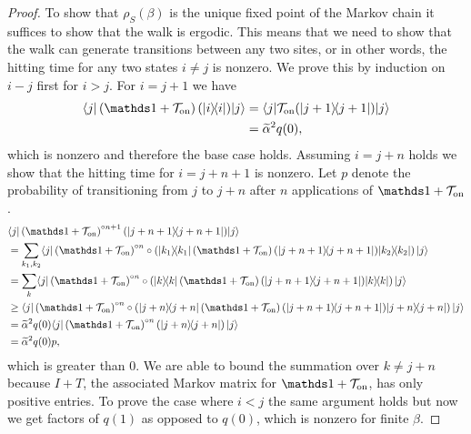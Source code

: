 \begin{proof}
    To show that $\rho_S(\beta)$ is the unique fixed point of the Markov chain it suffices to  show that the walk is ergodic. This means that we need to show that the walk can generate transitions between any two sites, or in other words, the hitting time for any two states $i \neq j$ is nonzero. We prove this by induction on $i - j$ first for $i > j$. For $i = j + 1$ we have
    \begin{align}
        \bra{j} \left( \identity + \TT_{\on} \right)(\ketbra{i}{i}) \ket{j} &= \bra{j} \TT_{\on}(\ketbra{j + 1}{j + 1}) \ket{j} \\
        &= \widetilde{\alpha}^2 q(0),
    \end{align} 
    which is nonzero and therefore the base case holds. Assuming $i = j + n$ holds we show that the hitting time for $i = j + n + 1$ is nonzero. Let $p$ denote the probability of transitioning from $j$ to $j + n$ after $n$ applications of $\identity + \TT_{\on}$. 
    \begin{align}
        &\bra{j } \left(\identity + \TT_{\on} \right)^{\circ n + 1} (\ketbra{j+ n + 1}{j+ n + 1}) \ket{j } \nonumber \\
        &= \sum_{k_1, k_2}\bra{j } \left(\identity + \TT_{\on} \right)^{\circ n} \circ \left(\ketbra{k_1}{k_1}\left(\identity + \TT_{\on} \right) (\ketbra{j+ n + 1}{j+ n + 1}) \ketbra{k_2}{k_2} \right) \ket{j } \\
        &= \sum_{k}\bra{j } \left(\identity + \TT_{\on} \right)^{\circ n} \circ \left(\ketbra{k}{k}\left(\identity + \TT_{\on} \right) (\ketbra{j+ n + 1}{j+ n + 1}) \ketbra{k}{k} \right) \ket{j } \\
        &\ge \bra{j } \left(\identity + \TT_{\on} \right)^{\circ n} \circ \left(\ketbra{j + n}{j + n}\left(\identity + \TT_{\on} \right) (\ketbra{j+ n + 1}{j+ n + 1}) \ketbra{j + n}{j + n} \right) \ket{j } \\
        &= \widetilde{\alpha}^2 q(0) \bra{j } \left(\identity + \TT_{\on} \right)^{\circ n} \left(\ketbra{j + n}{j + n}\right)\ket{j } \\
        &= \widetilde{\alpha}^2 q(0) p,
    \end{align}
    which is greater than 0. We are able to bound the summation over $k \neq j + n$ because $I + T$, the associated Markov matrix for $\identity + \TT_{\on}$, has only positive entries. To prove the case where $i < j$ the same argument holds but now we get factors of $q(1)$ as opposed to $q(0)$, which is nonzero for finite $\beta$. 


\end{proof}
